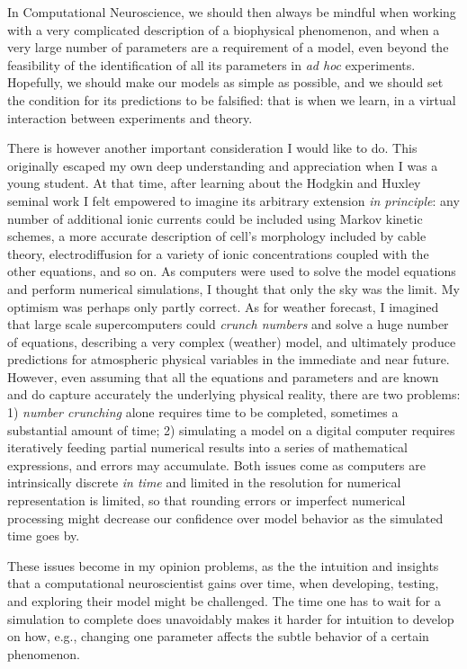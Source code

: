 In Computational Neuroscience, we should then always be mindful when working with a very complicated description of a biophysical phenomenon, and when a very large number of parameters are a requirement of a model, even beyond the feasibility of the identification of all its parameters in \textit{ad hoc} experiments. Hopefully, we should make our models as simple as possible, and we should set the condition for its predictions to be falsified: that is when we learn, in a virtual interaction between experiments and theory.

There is however another important consideration I would like to do. This originally escaped my own deep understanding and appreciation when I was a young student. At that time, after learning about the Hodgkin and Huxley seminal work I felt empowered to imagine its arbitrary extension \textit{in principle}: any number of additional ionic currents could be included using Markov kinetic schemes, a more accurate description of cell's morphology included by cable theory, electrodiffusion for a variety of ionic concentrations coupled with the other equations, and so on. As computers were used to solve the model equations and perform numerical simulations, I thought that only the sky was the limit. My optimism was perhaps only partly correct. As for weather forecast, I imagined that large scale supercomputers could \textit{crunch numbers} and solve a huge number of equations, describing a very complex (weather) model, and ultimately produce predictions for atmospheric physical variables in the immediate and near future. However, even assuming that all the equations and parameters and are known and do capture accurately the underlying physical reality, there are two problems: 1) \textit{number crunching} alone requires time to be completed, sometimes a substantial amount of time; 2) simulating a model on a digital computer requires iteratively feeding partial numerical results into a series of mathematical expressions, and errors may accumulate. Both issues come as computers are intrinsically discrete \textit{in time} and limited in the resolution for numerical representation is limited, so that rounding errors or imperfect numerical processing might decrease our confidence over model behavior as the simulated time goes by.

These issues become in my opinion problems, as the the intuition and insights that a computational neuroscientist gains over time, when developing, testing, and exploring their model might be challenged. The time one has to wait for a simulation to complete does unavoidably makes it harder for intuition to develop on how, e.g., changing one parameter affects the subtle behavior of a certain phenomenon. 

